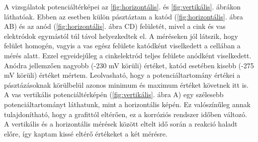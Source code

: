 A vizsgálatok potenciáltérképei az \ref{fig:horizontális}. és \ref{fig:vertikális}. ábrákon láthatóak. Ebben az esetben külön pásztáztam a katód (\ref{fig:horizontális}. ábra AB) és az anód (\ref{fig:horizontális}. ábra CD) felületét, mivel a cink és vas elektródok egymástól túl távol helyezkedtek el. A méréseken jól látszik, hogy felület homogén, vagyis a vas egész felülete katódként viselkedett a cellában a mérés alatt. Ezzel egyeidejűleg a cinkelektród teljes felülete anódként viselkedett. Anódra jellemzően nagyobb (-230 mV körüli) értéket, katód esetében kisebb (-275 mV körüli) értéket mértem. Leolvasható, hogy a potenciáltartomány értékei a pásztázásoknak körülbelül azonos minimum és maximum értéket követnek itt is. A vas vertikális potenciáltérképén (\ref{fig:vertikális}. ábra A) egy szélesebb potenciáltartományt láthatunk, mint a horizontális képén. Ez valószínűleg annak tulajdonítható, hogy a grafittól eltérően, ez a korróziós rendszer időben változó. A vertikális és a horizontális mérések között eltelt idő során a reakció haladt előre, így kaptam kissé eltérő értékeket a két mérésre. 


